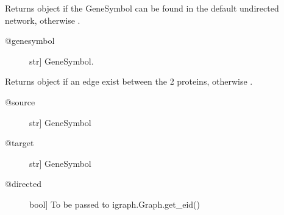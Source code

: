 \documentclass[letterpaper,10pt,english]{sphinxmanual}
\begin{document}
\begin{fulllineitems}

\begin{fulllineitems}
\label{\detokenize{main:pypath.main.PyPath.gs}}
Returns  object if the GeneSymbol
can be found in the default undirected network,
otherwise .
\begin{description}
\item[{@genesymbol}] \leavevmode{[}str{]}
GeneSymbol.

\end{description}

\end{fulllineitems}


\begin{fulllineitems}
\label{\detokenize{main:pypath.main.PyPath.gs_affected_by}}
\end{fulllineitems}


\begin{fulllineitems}
\label{\detokenize{main:pypath.main.PyPath.gs_affects}}
\end{fulllineitems}


\begin{fulllineitems}
\label{\detokenize{main:pypath.main.PyPath.gs_edge}}
Returns  object if an edge exist between
the 2 proteins, otherwise .
\begin{description}
\item[{@source}] \leavevmode{[}str{]}
GeneSymbol

\item[{@target}] \leavevmode{[}str{]}
GeneSymbol

\item[{@directed}] \leavevmode{[}bool{]}
To be passed to igraph.Graph.get\_eid()


\end{description}
\end{fulllineitems}
\end{fulllineitems}
\end{document}
